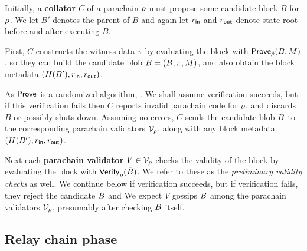 Initially, a {\bf collator} $C$ of a parachain $\rho$ must propose some candidate block $B$ for $\rho$.  We let $B'$ denotes the parent of $B$ and again let $r_{\mathsf{in}}$ and $r_{\mathsf{out}}$ denote state root before and after executing $B$.  

First, $C$ constructs the witness data $\pi$ by evaluating the block with $\mathsf{Prove}_{\hat{\rho}}(B,M)$, so they can build the candidate blob $\bar{B} = (B,\pi,M)$, and also obtain the block metadata $(H(B'),r_{\mathsf{in}},r_{\mathsf{out}})$.  

As $\mathsf{Prove}$ is a randomized algorithm, .  We shall assume verification succeeds, but if this verification fails then $C$ reports invalid parachain code for $\rho$, and discards $B$ or possibly shuts down.  Assuming no errors, $C$ sends the candidate blob $\bar{B}$ to the corresponding parachain validators $\mathcal{V}_{\rho}$, along with any block metadata $(H(B'),r_{\mathsf{in}},r_{\mathsf{out}})$. 

\smallskip

Next each {\bf parachain validator} $V \in \mathcal{V}_{\rho}$ checks the validity of the block by evaluating the block with $\mathsf{Verify}_{\rho}(\bar{B})$.  We refer to these as the {\em preliminary validity checks} as well.  We continue below if verification succeeds, but if verification fails, they reject the candidate $\bar{B}$ and   We expect $V$ gossips $\bar{B}$ among the parachain validators $\mathcal{V}_{\rho}$, presumably after checking $\bar{B}$ itself.

\subsection{Relay chain phase} %


